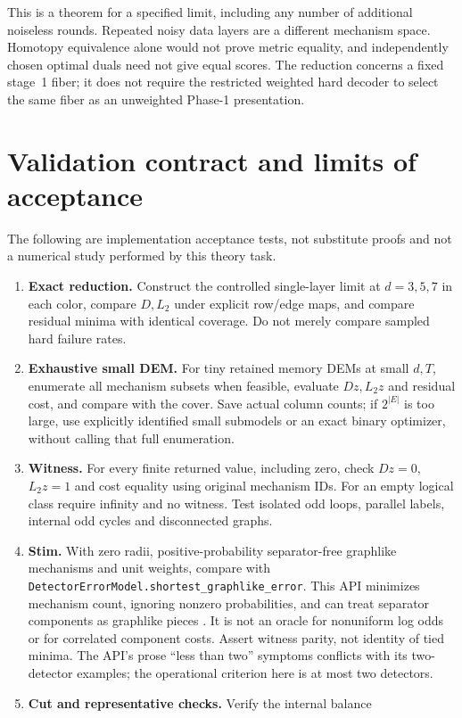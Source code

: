 This is a theorem for a specified limit, including any number of additional
noiseless rounds. Repeated noisy data layers are a different mechanism
space. Homotopy equivalence alone would not prove metric equality, and
independently chosen optimal duals need not give equal scores. The
reduction concerns a fixed stage~1 fiber; it does not require the
restricted weighted hard decoder to select the same fiber as an unweighted
Phase-1 presentation.

\section{Validation contract and limits of acceptance}
\label{sec:cl-validation}
The following are implementation acceptance tests, not substitute proofs
and not a numerical study performed by this theory task.
\begin{enumerate}
\item \textbf{Exact reduction.} Construct the controlled single-layer limit
at $d=3,5,7$ in each color, compare $D,L_2$ under explicit row/edge maps,
and compare residual minima with identical coverage. Do not merely compare
sampled hard failure rates.
\item \textbf{Exhaustive small DEM.} For tiny retained memory DEMs at small
$d,T$, enumerate all mechanism subsets when feasible, evaluate $Dz,L_2z$
and residual cost, and compare with the cover. Save actual column counts;
if $2^{|E|}$ is too large, use explicitly identified small submodels or an
exact binary optimizer, without calling that full enumeration.
\item \textbf{Witness.} For every finite returned value, including zero,
check $Dz=0$, $L_2z=1$ and cost equality using original mechanism IDs.
For an empty logical class require infinity and no witness. Test isolated
odd loops, parallel labels, internal odd cycles and disconnected graphs.
\item \textbf{Stim.} With zero radii, positive-probability separator-free
graphlike mechanisms and unit weights, compare with
\texttt{DetectorErrorModel.shortest\_graphlike\_error}. This API minimizes
mechanism count, ignoring nonzero probabilities, and can treat separator
components as graphlike pieces \cite{StimAPI}. It is not an oracle for
nonuniform log odds or for correlated component costs. Assert witness
parity, not identity of tied minima. The API's prose ``less than two''
symptoms conflicts with its two-detector examples; the operational
criterion here is at most two detectors.
\item \textbf{Cut and representative checks.} Verify the internal balance

\end{enumerate}
